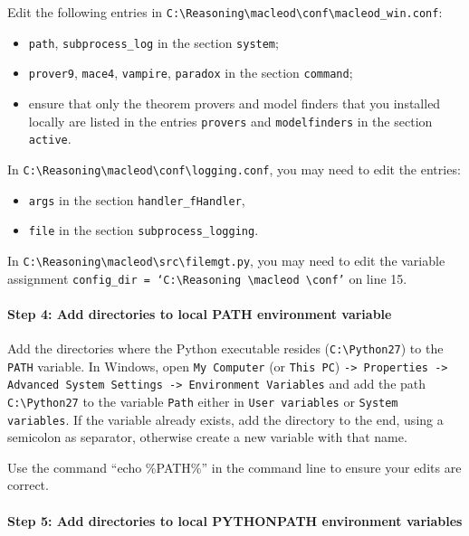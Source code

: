 \documentclass{article}
\begin{document}
Edit the following entries in \texttt{C:\textbackslash Reasoning\textbackslash macleod\textbackslash conf\textbackslash macleod\_win.conf}:
\begin{itemize}
\item  \texttt{path}, \texttt{subprocess\_log} in the section \texttt{system};
\item \texttt{prover9}, \texttt{mace4}, \texttt{vampire}, \texttt{paradox} in the section \texttt{command};
\item ensure that only the theorem provers and model finders that you installed locally are listed in the entries \texttt{provers} and \texttt{modelfinders} in the section \texttt{active}.
\end{itemize}
In \texttt{C:\textbackslash Reasoning\textbackslash macleod\textbackslash conf\textbackslash logging.conf}, you may need to edit the entries:
\begin{itemize}
\item \texttt{args} in the section \texttt{handler\_fHandler},
\item \texttt{file}  in the section \texttt{subprocess\_logging}.
\end{itemize}
In \texttt{C:\textbackslash Reasoning\textbackslash macleod\textbackslash src\textbackslash filemgt.py}, you may need to edit the variable assignment \texttt{config\_dir = `C:\textbackslash Reasoning \textbackslash macleod \textbackslash conf'} on line 15.


\paragraph{Step 4: Add directories to local PATH environment variable}

Add the directories where the Python executable resides (\texttt{C:\textbackslash Python27}) to the \texttt{PATH} variable. In Windows, open \texttt{My Computer} (or \texttt{This PC}) \texttt{-> Properties -> Advanced System Settings -> Environment Variables} and add the path \texttt{C:\textbackslash Python27} to the variable \texttt{Path} either in \texttt{User variables} or \texttt{System variables}. If the variable already exists, add the directory to the end, using a semicolon as separator, otherwise create a new variable with that name. 

Use the command ``echo \%PATH\%'' in the command line to ensure your edits are correct.

\paragraph{Step 5: Add directories to local PYTHONPATH environment variables}
\end{document}
